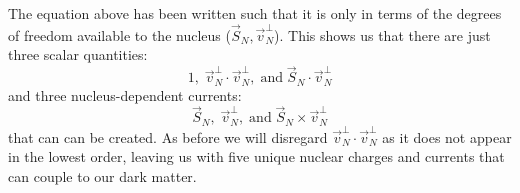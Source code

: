 The equation above has been written such that it is only in terms of the degrees of freedom available to the nucleus ($\vec{S}_{N},\vec{v}^{\perp}_{N}$).
This shows us that there are just three scalar quantities: 
\begin{equation}
    1,\; \vec{v}^{\perp}_{N} \cdot \vec{v}^{\perp}_{N}, \; \text{and} \; \vec{S}_{N} \cdot \vec{v}^{\perp}_{N}
\end{equation}
and three nucleus-dependent currents:
\begin{equation}
    \vec{S}_{N},\; \vec{v}^{\perp}_{N}, \; \text{and} \; \vec{S}_{N} \times \vec{v}^{\perp}_{N}
\end{equation}
that can can be created.
As before we will disregard $\vec{v}^{\perp}_{N} \cdot \vec{v}^{\perp}_{N}$ as it does not appear in the lowest order, leaving us with five unique nuclear charges and currents that can couple to our dark matter.

